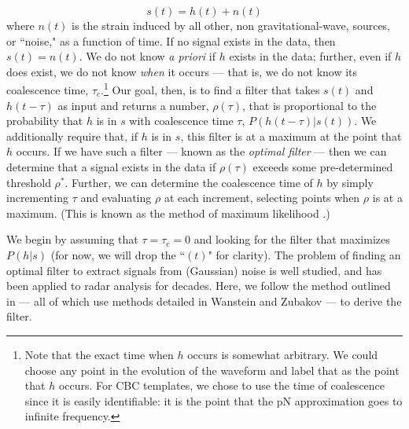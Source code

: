 \begin{equation}
\label{eqn:ifo_data}
s(t) = h(t) + n(t)
\end{equation}
where $n(t)$ is the strain induced by all other, non gravitational-wave,  sources, or ``noise," as a function of time. If no signal exists in the data, then $s(t) = n(t)$. We do not know \emph{a priori} if $h$ exists in the data; further, even if $h$ does exist, we do not know \emph{when} it occurs --- that is, we do not know its coalescence time, $\tau_c$.\footnote{Note that the exact time when $h$ occurs is somewhat arbitrary. We could choose any point in the evolution of the waveform and label that as the point that $h$ occurs. For \ac{CBC} templates, we chose to use the time of coalescence since it is easily identifiable: it is the point that the \ac{pN} approximation goes to infinite frequency.} Our goal, then, is to find a filter that takes $s(t)$ and $h(t-\tau)$ as input and returns a number, $\rho(\tau)$, that is proportional to the probability that $h$ is in $s$ with coalescence time $\tau$, $P(h(t-\tau)|s(t))$. We additionally require that, if $h$ is in $s$, this filter is at a maximum at the point that $h$ occurs. If we have such a filter --- known as the \emph{optimal filter} --- then we can determine that a signal exists in the data if $\rho(\tau)$ exceeds some pre-determined threshold $\rho^{*}$. Further, we can determine the coalescence time of $h$ by simply incrementing $\tau$ and evaluating $\rho$ at each increment, selecting points when $\rho$ is at a maximum. (This is known as the method of maximum likelihood \cite{Brown}.)

We begin by assuming that $\tau = \tau_c = 0$ and looking for the filter that maximizes $P(h|s)$ (for now, we will drop the ``$(t)$" for clarity). The problem of finding an optimal filter to extract signals from (Gaussian) noise is well studied, and has been applied to radar analysis for decades. Here, we follow the method outlined in \cite{Finn1992,FinnChernoff:1993,Brown} --- all of which use methods detailed in Wanstein and Zubakov \cite{wainstein:1962} --- to derive the filter.

